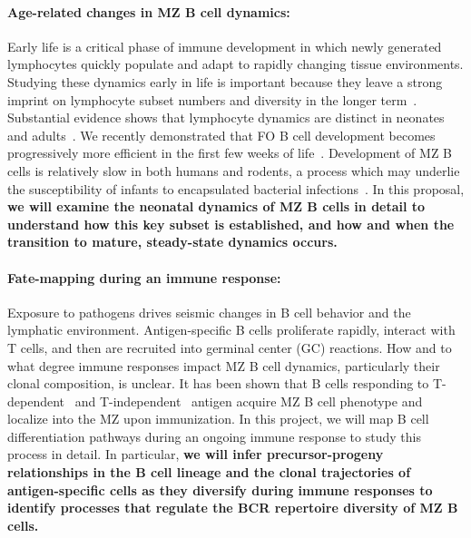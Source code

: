 \documentclass[11pt]{article}
\newcommand{\para}[1]{\vspace*{-4.5mm}\paragraph{#1}}
\begin{document}
\para{Age-related changes in MZ B cell dynamics:} 
Early life is a critical phase of immune development in which newly generated lymphocytes quickly populate and adapt to rapidly changing tissue environments.
Studying these dynamics early in life is important because they leave a strong imprint on lymphocyte subset numbers and diversity in the longer term~\cite{Farber_2013, Hogan_2015, Gaimann_2020,  Davenport_2020}.
Substantial evidence shows that lymphocyte dynamics are distinct in neonates and adults~\cite{LeCampion_2002, Scho_nland_2003,Reynaldi_2019}. 
We recently demonstrated that FO B cell development becomes progressively more efficient in the first few weeks of life~\cite{Verheijen_2020}.
Development of MZ B cells is relatively slow in both humans and rodents, a process which may underlie the susceptibility of infants to encapsulated bacterial infections~\cite{MacLennan_1985, Mond_1995, Martin_2002}.
In this proposal, \textbf{we will examine the neonatal dynamics of MZ B cells in detail to understand how this key subset is established, and how and when the transition to mature, steady-state dynamics occurs.}


\para{Fate-mapping during an immune response:} 
Exposure to pathogens drives seismic changes in B cell behavior and the lymphatic environment. Antigen-specific B cells proliferate rapidly, interact with T cells, and then are recruited into germinal center (GC) reactions. 
How and to what degree immune responses impact MZ B cell dynamics, particularly their clonal composition, is unclear.
It has been shown that B cells responding to T-dependent~\cite{Liu_1988, Yang_Shih_2002} and T-independent~\cite{Vinuesa_2003} antigen acquire MZ B cell phenotype and localize into the MZ upon immunization.
In this project, we will map B cell differentiation pathways during an ongoing immune response to study this process in detail. %
In particular, \textbf{we will infer precursor-progeny relationships in the B cell lineage and the clonal trajectories of antigen-specific cells as they diversify during immune responses to identify processes that regulate the BCR repertoire diversity of MZ B cells.}
 
\end{document}
